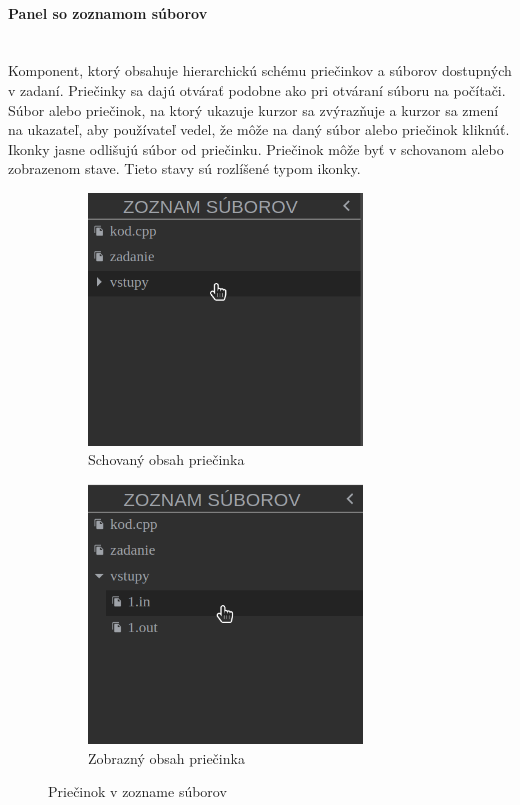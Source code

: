 \paragraph{Panel so zoznamom súborov}\leavevmode\\
Komponent, ktorý obsahuje hierarchickú schému priečinkov a súborov dostupných v zadaní. Priečinky sa
dajú otvárať podobne ako pri otváraní súboru na počítači. Súbor alebo priečinok, na ktorý ukazuje
kurzor sa zvýrazňuje a kurzor sa zmení na ukazateľ, aby používateľ vedel, že môže na daný súbor
alebo priečinok kliknúť. Ikonky jasne odlišujú súbor od priečinku. Priečinok môže byť v schovanom
alebo zobrazenom stave. Tieto stavy sú rozlíšené typom ikonky.
\begin{figure}[H]
\centering
\begin{subfigure}{.5\textwidth}
  \centering
  \includegraphics[width=0.8\textwidth]{images/schovany_zoznam}
  \caption[Schovaný obsah priečinka]{Schovaný obsah priečinka}
  \label{obr:schovany_zoznam}
\end{subfigure}%
\begin{subfigure}{.5\textwidth}
  \centering
  \includegraphics[width=0.8\textwidth]{images/zobrazeny_zoznam}
  \caption[Zobrazný obsah priečinka]{Zobrazný obsah priečinka}
  \label{obr:zobrazeny_zoznam}
\end{subfigure}
\caption{Priečinok v zozname súborov}
\end{figure}


